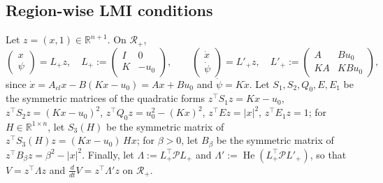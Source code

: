 \documentclass[preprint,12pt,authoryear]{elsarticle}
\theoremstyle{definition}
\theoremstyle{remark}
\newcommand{\R}{\mathbb{R}}
\newcommand{\tr}{^{\top}}
\newcommand{\PP}{\mathcal{P}}
\DeclareMathOperator{\He}{He}
\begin{document}
\subsection{Region-wise LMI conditions}
Let $z=(x,1)\in\R^{n+1}$. On $\mathcal R_+$,
\begin{equation}\label{eq:Lplus}
\begin{pmatrix}x\\\psi\end{pmatrix}=L_+z,\quad L_+:=\begin{pmatrix}I&0\\K&-u_0\end{pmatrix},\qquad
\begin{pmatrix}\dot x\\\dot\psi\end{pmatrix}=L'_+z,\quad L'_+:=\begin{pmatrix}A&Bu_0\\KA&KBu_0\end{pmatrix},
\end{equation}
since $\dot x=A_{cl}x-B(Kx-u_0)=Ax+Bu_0$ and $\dot\psi=K\dot x$. Let $S_1,S_2,Q_0,E,E_1$ be the symmetric matrices of the quadratic forms $z\tr S_1z=Kx-u_0$, $z\tr S_2z=(Kx-u_0)^2$, $z\tr Q_0z=u_0^2-(Kx)^2$, $z\tr Ez=|x|^2$, $z\tr E_1z=1$; for $H\in\R^{1\times n}$, let $S_3(H)$ be the symmetric matrix of $z\tr S_3(H)z=(Kx-u_0)\,Hx$; for $\beta>0$, let $B_\beta$ be the symmetric matrix of $z\tr B_\beta z=\beta^2-|x|^2$. Finally, let $\Lambda:=L_+\tr\PP L_+$ and $\Lambda':=\He(L_+\tr\PP L'_+)$, so that $V=z\tr\Lambda z$ and $\frac{d}{dt}V=z\tr\Lambda'z$ on $\mathcal R_+$.
\end{document}
